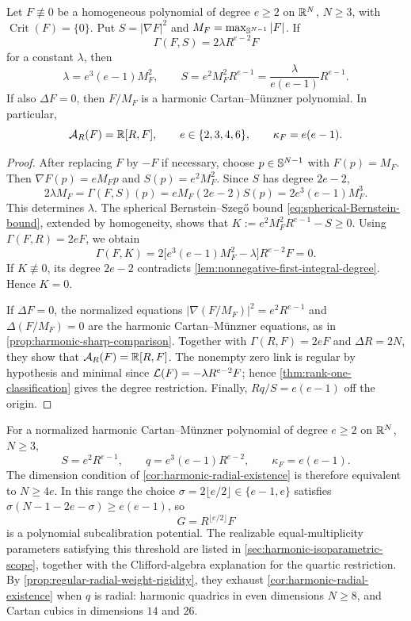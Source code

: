 \begin{proposition}
\label{prop:regular-radial-weight-rigidity}
Let \(F\not\equiv0\) be a homogeneous polynomial of degree \(e\ge2\) on
\(\mathbb R^N\), \(N\ge3\), with \(\operatorname{Crit}(F)=\{0\}\).
Put \(S=|\nabla F|^2\) and
\(M_F=\max_{\mathbb S^{N-1}}|F|\). If
\[
 \Gamma(F,S)=2\lambda R^{e-2}F
\]
for a constant \(\lambda\), then
\[
 \lambda=e^3(e-1)M_F^2,\qquad
 S=e^2M_F^2R^{e-1}=\frac{\lambda}{e(e-1)}R^{e-1}.
\]
If also \(\Delta F=0\), then \(F/M_F\) is a harmonic
Cartan--M\"unzner polynomial. In particular,
\[
 \mathcal A_R(F)=\mathbb R[R,F],\qquad e\in\{2,3,4,6\},\qquad
 \kappa_F=e(e-1).
\]
\end{proposition}

\begin{proof}
After replacing \(F\) by \(-F\) if necessary, choose
\(p\in\mathbb S^{N-1}\) with \(F(p)=M_F\). Then
\(\nabla F(p)=eM_Fp\) and \(S(p)=e^2M_F^2\).
Since \(S\) has degree \(2e-2\),
\[
 2\lambda M_F=\Gamma(F,S)(p)
 =eM_F(2e-2)S(p)=2e^3(e-1)M_F^3.
\]
This determines \(\lambda\). The spherical Bernstein--Szeg\H{o}
bound \eqref{eq:spherical-Bernstein-bound}, extended by homogeneity,
shows that \(K:=e^2M_F^2R^{e-1}-S\ge0\).
Using \(\Gamma(F,R)=2eF\), we obtain
\[
 \Gamma(F,K)
 =2\bigl[e^3(e-1)M_F^2-\lambda\bigr]R^{e-2}F=0.
\]
If \(K\not\equiv0\), its degree \(2e-2\) contradicts
\cref{lem:nonnegative-first-integral-degree}. Hence \(K=0\).

If \(\Delta F=0\), the normalized equations
\(|\nabla(F/M_F)|^2=e^2R^{e-1}\) and \(\Delta(F/M_F)=0\)
are the harmonic Cartan--M\"unzner equations, as in
\cref{prop:harmonic-sharp-comparison}. Together with
\(\Gamma(R,F)=2eF\) and \(\Delta R=2N\), they show that
\(\mathcal A_R(F)=\mathbb R[R,F]\). The nonempty zero link is regular by hypothesis
and minimal since \(\mathcal L(F)=-\lambda R^{e-2}F\); hence
\cref{thm:rank-one-classification} gives the degree restriction.
Finally, \(Rq/S=e(e-1)\) off the origin.
\end{proof}

\begin{example}
\label{ex:harmonic-isoparametric-radial}
For a normalized harmonic Cartan--M\"unzner polynomial of degree
\(e\ge2\) on \(\mathbb R^N\), \(N\ge3\),
\[
 S=e^2R^{e-1},\qquad q=e^3(e-1)R^{e-2},\qquad
 \kappa_F=e(e-1).
\]
The dimension condition of \cref{cor:harmonic-radial-existence}
is therefore equivalent to \(N\ge4e\). In this range the choice
\(\sigma=2\lfloor e/2\rfloor\in\{e-1,e\}\) satisfies
\(\sigma(N-1-2e-\sigma)\ge e(e-1)\), so
\[
 G=R^{\lfloor e/2\rfloor}F
\]
is a polynomial subcalibration potential.
The realizable equal-multiplicity parameters satisfying this threshold
are listed in \cref{sec:harmonic-isoparametric-scope}, together with
the Clifford-algebra explanation for the quartic restriction.
By \cref{prop:regular-radial-weight-rigidity}, they exhaust
\cref{cor:harmonic-radial-existence} when \(q\) is radial:
harmonic quadrics in even dimensions \(N\ge8\), and Cartan cubics
in dimensions \(14\) and \(26\).
\end{example}

